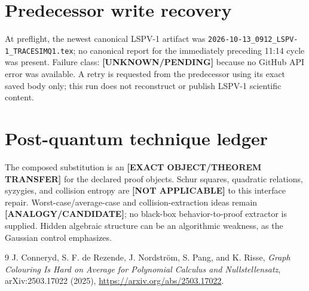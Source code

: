\documentclass[11pt]{article}
\newcommand{\status}[1]{\textbf{[#1]}}
\begin{document}
\section{Predecessor write recovery}
At preflight, the newest canonical LSPV-1 artifact was
\texttt{2026-10-13\_0912\_LSPV-1\_TRACESIMQ1.tex}; no canonical report for the
immediately preceding 11:14 cycle was present.  Failure class:
\status{UNKNOWN/PENDING} because no GitHub API error was available.  A retry is
requested from the predecessor using its exact saved body only; this run does
not reconstruct or publish LSPV-1 scientific content.

\section{Post-quantum technique ledger}
The composed substitution is an \status{EXACT OBJECT/THEOREM TRANSFER} for the
declared proof objects.  Schur squares, quadratic relations, syzygies, and
collision entropy are \status{NOT APPLICABLE} to this interface repair.
Worst-case/average-case and collision-extraction ideas remain
\status{ANALOGY/CANDIDATE}; no black-box behavior-to-proof extractor is supplied.
Hidden algebraic structure can be an algorithmic weakness, as the Gaussian
control emphasizes.

\begin{thebibliography}{9}
J. Conneryd, S. F. de Rezende, J. Nordstr\"om, S. Pang, and K. Risse,
\emph{Graph Colouring Is Hard on Average for Polynomial Calculus and
Nullstellensatz}, arXiv:2503.17022 (2025),
\url{https://arxiv.org/abs/2503.17022}.
\end{thebibliography}
\end{document}
